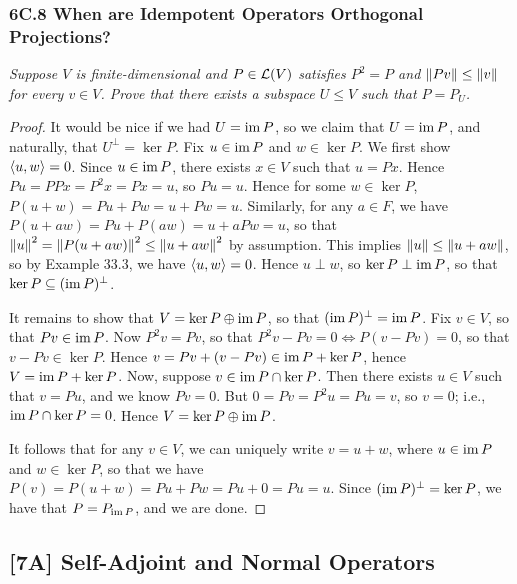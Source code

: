 \documentclass{article}
\begin{document}
\subsubsection*{6C.8 When are Idempotent Operators  Orthogonal Projections?}
\textit{Suppose $V$ is finite-dimensional and $P\in\mathcal L(V)$ satisfies $P^2=P$ and $\left\Vert Pv\right\Vert\leq \left\Vert v\right\Vert$ for every $v\in V$. Prove that there exists a subspace $U\leq V$ such that $P = P_U$.}
\begin{proof}
It would be nice if we had $U = \operatorname{im} P$, so we claim that $U = \operatorname{im} P$, and naturally, that $U^\perp = \ker P$. Fix $u\in \operatorname{im} P$ and $w\in \ker P$. We first show $\left\langle u,w\right\rangle = 0$. Since $u\in\operatorname{im} P$, there exists $x\in V$ such that $u = Px$. Hence $Pu = PPx = P^2x = Px = u$, so $Pu = u$. Hence for some $w\in\ker P$, $P(u+w) = Pu + Pw = u + Pw = u$. Similarly, for any $a\in F$, we have $P(u+aw) = Pu + P(aw) = u + aPw = u$, so that $\left\Vert u\right\Vert^2 = \left\Vert P(u + aw)\right\Vert^2 \leq \left\Vert u+aw\right\Vert^2$ by assumption. This implies $\left\Vert u\right\Vert \leq \left\Vert u+aw\right\Vert$, so by Example 33.3, we have $\left\langle u, w\right\rangle = 0$. Hence $u\perp w$, so $\ker P \perp \operatorname{im} P$, so that $\ker P \subseteq (\operatorname{im} P)^\perp$.

It remains to show that $V = \ker P \oplus \operatorname{im} P$, so that $(\operatorname{im} P)^\perp =\operatorname{im} P$. Fix $v\in V$, so that $Pv\in \operatorname{im} P$. Now $P^2v = Pv$, so that $P^2v - Pv = 0 \iff P(v-Pv) = 0$, so that $v-Pv\in \ker P$. Hence $v = Pv + (v-Pv)\in \operatorname{im} P + \ker P$, hence $V = \operatorname{im} P + \ker P$. Now, suppose $v\in \operatorname{im} P\cap \ker P$. Then there exists $u\in V$ such that $v = Pu$, and we know $Pv = 0$. But $0 = Pv = P^2u = Pu = v$, so $v = 0$; i.e., $\operatorname{im} P\cap \ker P = 0$. Hence $V = \ker P\oplus \operatorname{im} P$.

It follows that for any $v\in V$, we can uniquely write $v = u+w$, where $u\in\operatorname{im} P$ and $w\in \ker P$, so that we have $P(v) = P(u+w) = Pu + Pw = Pu + 0 = Pu = u$. Since $(\operatorname{im} P)^\perp = \ker P$, we have that $P = P_{\operatorname{im} P}$, and we are done.
\end{proof}

\subsection*{[7A] Self-Adjoint and Normal Operators}
\end{document}
